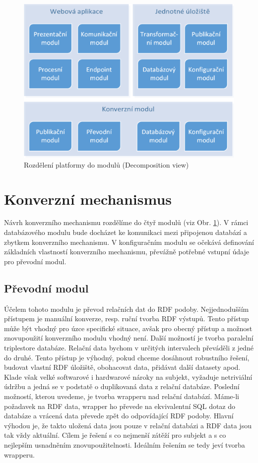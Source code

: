 \begin{figure}[H]
\centerline{\includegraphics[width=\textwidth]{img/decompositionView.eps}}
\caption{Rozdělení platformy do modulů (Decomposition view)}
\label{obr:decompositionView}
\end{figure}

\section{Konverzní mechanismus}

Návrh konverzního mechanismu rozdělíme do čtyř modulů (viz Obr. \ref{obr:decompositionView}). V rámci databázového modulu bude docházet ke komunikaci mezi připojenou databází a zbytkem konverzního mechanismu. V konfiguračním modulu se očekává definování základních vlastností konverzního mechanismu, převážně potřebné vstupní údaje pro převodní modul.

\subsection*{Převodní modul}

Účelem tohoto modulu je převod relačních dat do RDF podoby. Nejjednodušším přístupem je manuální konverze, resp. ruční tvorba RDF výstupů. Tento přístup může být vhodný pro úzce specifické situace, avšak pro obecný přístup a možnost znovupoužití konverzního modulu vhodný není. Další možností je tvorba paralelní triplestore databáze. Relační data bychom v určitých intervalech převáděli z jedné do druhé. Tento přístup je výhodný, pokud chceme dosáhnout robustního řešení, budovat vlastní RDF úložiště, obohacovat data, přidávat další datasety apod. Klade však velké softwarové i hardwarové nároky na subjekt, vyžaduje netriviální údržbu a jedná se v podstatě o duplikovaná data z relační databáze. Poslední možností, kterou uvedeme, je tvorba wrapperu nad relační databází. Máme-li požadavek na RDF data, wrapper ho převede na ekvivalentní SQL dotaz do databáze a vrácená data převede zpět do odpovídající RDF podoby. Hlavní výhodou je, že takto uložená data jsou pouze v relační databázi a RDF data jsou tak vždy aktuální. Cílem je řešení s co nejmenší zátěží pro subjekt a s co nejlepším usnadněním znovupoužitelnosti. Ideálním řešením se tedy jeví tvorba wrapperu.

